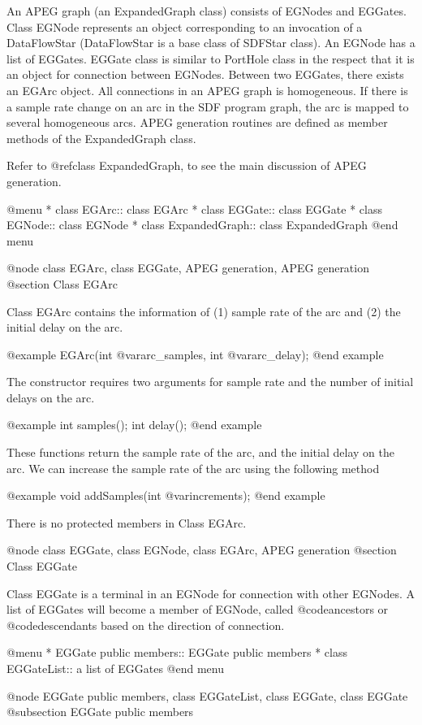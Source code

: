 An APEG graph (an ExpandedGraph class) consists of EGNodes and 
EGGates. Class EGNode represents
an object corresponding to an invocation of a DataFlowStar (DataFlowStar
is a base class of SDFStar class). An EGNode has a list of EGGates.
EGGate class is similar to PortHole class in the respect that it
is an object for connection between EGNodes. Between two EGGates,
there exists an EGArc object. All connections in an APEG
graph is homogeneous. If there is a sample rate change on an arc in the
SDF program graph, the arc is mapped to several homogeneous arcs.
APEG generation routines are defined as member methods of the ExpandedGraph
class.

Refer to @ref{class ExpandedGraph}, to see the main discussion of APEG
generation.

@menu
* class EGArc::			class EGArc
* class EGGate::		class EGGate
* class EGNode::		class EGNode
* class ExpandedGraph::		class ExpandedGraph
@end menu

@node class EGArc, class EGGate, APEG generation, APEG generation
@section Class EGArc

Class EGArc contains the information of (1) sample rate
of the arc and (2) the initial delay on the arc.

@example
EGArc(int @var{arc_samples}, int @var{arc_delay});
@end example

The constructor requires two arguments for sample rate and the
number of initial delays on the arc.

@example
int samples();
int delay();
@end example

These functions return the sample rate of the arc, and the
initial delay on the arc. We can increase the sample rate of the
arc using the following method

@example
void addSamples(int @var{increments});
@end example

There is no protected members in Class EGArc.

@node class EGGate, class EGNode, class EGArc, APEG generation
@section Class EGGate

Class EGGate is a terminal in an EGNode for connection with other
EGNodes. A list of EGGates will become a member of EGNode, called
@code{ancestors} or @code{descendants} based on the direction of connection.

@menu
* EGGate public members::	EGGate public members
* class EGGateList::		a list of EGGates
@end menu

@node EGGate public members, class EGGateList, class EGGate, class EGGate
@subsection EGGate public members

